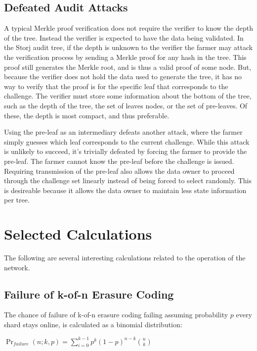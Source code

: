\documentclass[a4paper,10pt]{article}
\begin{document}
\subsection{Defeated Audit Attacks}
A typical Merkle proof verification does not require the verifier to know the depth of the tree. Instead the verifier is expected to have the data being validated. In the Storj audit tree, if the depth is unknown to the verifier the farmer may attack the verification process by sending a Merkle proof for any hash in the tree. This proof still generates the Merkle root, and is thus a valid proof of some node. But, because the verifier does not hold the data used to generate the tree, it has no way to verify that the proof is for the specific leaf that corresponds to the challenge. The verifier must store some information about the bottom of the tree, such as the depth of the tree, the set of leaves nodes, or the set of pre-leaves. Of these, the depth is most compact, and thus preferable.

Using the pre-leaf as an intermediary defeats another attack, where the farmer simply guesses which leaf corresponds to the current challenge. While this attack is unlikely to succeed, it’s trivially defeated by forcing the farmer to provide the pre-leaf. The farmer cannot know the pre-leaf before the challenge is issued. Requiring transmission of the pre-leaf also allows the data owner to proceed through the challenge set linearly instead of being forced to select randomly. This is desireable because it allows the data owner to maintain less state information per tree.

\section{Selected Calculations}
The following are several interesting calculations related to the operation of the network.

\subsection{Failure of k-of-n Erasure Coding}
The chance of failure of k-of-n erasure coding failing assuming probability $ p $ every shard stays online, is calculated as a binomial distribution:

{\centering
$\Pr_{failure}(n; k,p) = \displaystyle \sum_{i=0}^{k-1} p^{k}(1-p)^{n-k }{n \choose k}$
\\}
\end{document}

